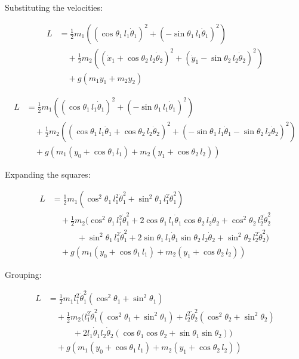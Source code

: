 \documentclass[11pt,a4paper]{article}
\begin{document}
Substituting the velocities:

\begin{align*}
L &= \frac{1}{2} m_1 \left( (\cos\theta_1 \, l_1 \dot{\theta}_1)^2 + (-\sin\theta_1 \, l_1 \dot{\theta}_1)^2 \right) \\
  &\quad + \frac{1}{2} m_2 \left( (\dot{x}_1 + \cos\theta_2 \, l_2 \dot{\theta}_2)^2 + (\dot{y}_1 - \sin\theta_2 \, l_2 \dot{\theta}_2)^2 \right) \\
  &\quad + g \left( m_1 y_1 + m_2 y_2 \right)
\end{align*}

\begin{align*}
L &= \frac{1}{2} m_1 \left( (\cos\theta_1 \, l_1 \dot{\theta}_1)^2 + (-\sin\theta_1 \, l_1 \dot{\theta}_1)^2 \right) \\
  &\quad + \frac{1}{2} m_2 \left( (\cos\theta_1 \, l_1 \dot{\theta}_1 + \cos\theta_2 \, l_2 \dot{\theta}_2)^2 + (-\sin\theta_1 \, l_1 \dot{\theta}_1 - \sin\theta_2 \, l_2 \dot{\theta}_2)^2 \right) \\
  &\quad + g \left( m_1 (y_0 + \cos\theta_1 \, l_1) + m_2 (y_1 + \cos\theta_2 \, l_2) \right)
\end{align*}

Expanding the squares:

\begin{align*}
L &= \frac{1}{2} m_1 \left( \cos^2\theta_1 \, l_1^2 \dot{\theta}_1^2 + \sin^2\theta_1 \, l_1^2 \dot{\theta}_1^2 \right) \\
  &\quad + \frac{1}{2} m_2 \big( \cos^2\theta_1 \, l_1^2 \dot{\theta}_1^2 + 2 \cos\theta_1 \, l_1 \dot{\theta}_1 \cos\theta_2 \, l_2 \dot{\theta}_2 + \cos^2\theta_2 \, l_2^2 \dot{\theta}_2^2 \\
  &\quad\quad\quad + \sin^2\theta_1 \, l_1^2 \dot{\theta}_1^2 + 2 \sin\theta_1 \, l_1 \dot{\theta}_1 \sin\theta_2 \, l_2 \dot{\theta}_2 + \sin^2\theta_2 \, l_2^2 \dot{\theta}_2^2 \big) \\
  &\quad + g \left( m_1 (y_0 + \cos\theta_1 \, l_1) + m_2 (y_1 + \cos\theta_2 \, l_2) \right)
\end{align*}

Grouping:

\begin{align*}
L &= \frac{1}{2} m_1 l_1^2 \dot{\theta}_1^2 (\cos^2\theta_1 + \sin^2\theta_1) \\
  &\quad + \frac{1}{2} m_2 \big( l_1^2 \dot{\theta}_1^2 (\cos^2\theta_1 + \sin^2\theta_1) + l_2^2 \dot{\theta}_2^2 (\cos^2\theta_2 + \sin^2\theta_2) \\
  &\quad\quad\quad + 2 l_1 \dot{\theta}_1 l_2 \dot{\theta}_2 (\cos\theta_1 \cos\theta_2 + \sin\theta_1 \sin\theta_2) \big) \\
  &\quad + g \left( m_1 (y_0 + \cos\theta_1 \, l_1) + m_2 (y_1 + \cos\theta_2 \, l_2) \right)
\end{align*}
\end{document}
